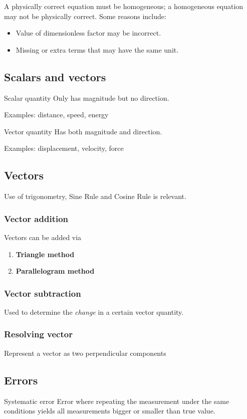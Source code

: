 A physically correct equation must be homogeneous; a homogeneous equation may not be physically correct. Some reasons include:
\begin{itemize}
    \item Value of dimensionless factor may be incorrect.
    \item Missing or extra terms that may have the same unit.
\end{itemize}

\subsection{Scalars and vectors}
\begin{defn}{Scalar quantity}{}
Only has magnitude but no direction.
\end{defn}
Examples: distance, speed, energy

\begin{defn}{Vector quantity}{}
Has both magnitude and direction.
\end{defn}
Examples: displacement, velocity, force

\subsection{Vectors}
Use of trigonometry, Sine Rule and Cosine Rule is relevant.
\subsubsection{Vector addition}
Vectors can be added via
\begin{enumerate}
\item \textbf{Triangle method}

\item \textbf{Parallelogram method}

\end{enumerate}

\subsubsection{Vector subtraction}
Used to determine the \emph{change} in a certain vector quantity.

\subsubsection{Resolving vector}
Represent a vector as two perpendicular components
\pagebreak

\subsection{Errors}
\begin{defn}{Systematic error}{}
Error where repeating the measurement under the same conditions yields all measurements bigger or smaller than true value. 
\end{defn}

